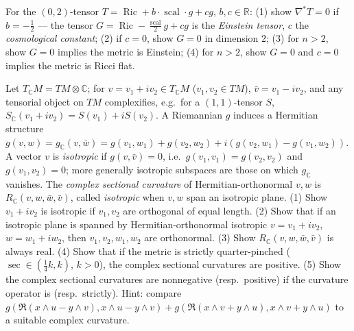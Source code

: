 \begin{remark}[Exercise 3.4.16]
  \label{rem:pet-ch3-ex-16}
  \leanok
  For the $(0,2)$-tensor $T=\operatorname{Ric}+b\cdot\operatorname{scal}\cdot
  g+cg$, $b,c\in\mathbb R$: (1) show $\nabla^*T=0$ if $b=-\tfrac12$ — the tensor
  $G=\operatorname{Ric}-\tfrac{\operatorname{scal}}2g+cg$ is the \emph{Einstein
  tensor}, $c$ the \emph{cosmological constant}; (2) if $c=0$, show $G=0$ in
  dimension $2$; (3) for $n>2$, show $G=0$ implies the metric is Einstein; (4)
  for $n>2$, show $G=0$ and $c=0$ implies the metric is Ricci flat.
\end{remark}

\begin{remark}[Exercise 3.4.17]
  \label{rem:pet-ch3-ex-17}
  \leanok
  Let $T_{\mathbb C}M=TM\otimes\mathbb C$; for $v=v_1+iv_2\in T_{\mathbb C}M$
  ($v_1,v_2\in TM$), $\bar v=v_1-iv_2$, and any tensorial object on $TM$
  complexifies, e.g.\ for a $(1,1)$-tensor $S$,
  $S_{\mathbb C}(v_1+iv_2)=S(v_1)+iS(v_2)$. A Riemannian $g$ induces a Hermitian
  structure $g(v,w)=g_{\mathbb C}(v,\bar w)=g(v_1,w_1)+g(v_2,w_2)+i(g(v_2,w_1)-g(v_1,w_2))$.
  A vector $v$ is \emph{isotropic} if $g(v,\bar v)=0$, i.e.\
  $g(v_1,v_1)=g(v_2,v_2)$ and $g(v_1,v_2)=0$; more generally isotropic subspaces
  are those on which $g_{\mathbb C}$ vanishes. The \emph{complex sectional
  curvature} of Hermitian-orthonormal $v,w$ is $R_{\mathbb C}(v,w,\bar w,\bar v)$,
  called \emph{isotropic} when $v,w$ span an isotropic plane. (1) Show $v_1+iv_2$
  is isotropic if $v_1,v_2$ are orthogonal of equal length. (2) Show that if an
  isotropic plane is spanned by Hermitian-orthonormal isotropic $v=v_1+iv_2$,
  $w=w_1+iw_2$, then $v_1,v_2,w_1,w_2$ are orthonormal. (3) Show
  $R_{\mathbb C}(v,w,\bar w,\bar v)$ is always real. (4) Show that if the metric
  is strictly quarter-pinched ($\sec\in(\tfrac14k,k)$, $k>0$), the complex
  sectional curvatures are positive. (5) Show the complex sectional curvatures
  are nonnegative (resp.\ positive) if the curvature operator is (resp.\
  strictly). Hint: compare
  $g(\mathfrak R(x\wedge u-y\wedge v),x\wedge u-y\wedge v)+g(\mathfrak R(x\wedge
  v+y\wedge u),x\wedge v+y\wedge u)$ to a suitable complex curvature.
  \source{petersen:page-0124,petersen:page-0125}
\end{remark}

